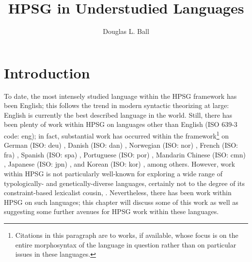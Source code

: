 \documentclass[output=paper]{langsci/langscibook}
\title{HPSG in Understudied Languages}
\author{%
	Douglas L. Ball\affiliation{Truman State University}%
}
\begin{document}
\label{understudied-languages}
	
{

\section{Introduction}

To date, the most intensely studied language within the HPSG framework has been English; this follows the trend in modern syntactic theorizing at large: English is currently the best described language in the world. Still, there has been plenty of work within HPSG on languages other than English (ISO 639-3 code: eng); in fact, substantial work has occurred within the framework\footnote{Citations in this paragraph are  to works, if available, whose focus is on the entire morphosyntax of the language in question rather than on particular issues in these languages.} on 
German (ISO: deu) \citep{Crysmann2003b,MuellerLehrbuch3}, 
Danish (ISO: dan) \citep{MOeDanish}, 
Norwegian (ISO: nor) \citep{HH2004a-u}, 
French (ISO: fra) \citep{AG2000a,AG2002b-u,abegod04,ABGT2006a-u}, 
Spanish (ISO: spa) \citep{Marimon2013a-u}, 
Portuguese (ISO: por) \citep{BC2008a-u}, 
Mandarin Chinese (ISO: cmn) \citep{ML2013a,MLChinese,YF2014a-u}, 
Japanese (ISO: jpn) \citep{SBB2016a}, and 
Korean (ISO: kor) \citep{KYSB2011a-u}, among others. However, work within HPSG is not particularly well-known for exploring a wide range of typologically- and genetically-diverse languages, certainly not to the degree of its constraint-based lexicalist cousin, . Nevertheless, there has been work within HPSG on such languages; this chapter will discuss some of this work as well as suggesting some further avenues for HPSG work within these languages.

}
\end{document}
